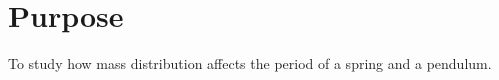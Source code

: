 
\section{Purpose}
\vspace{-0.5cm}
\singlespacing

To study how mass distribution affects the period of a spring and a pendulum.
